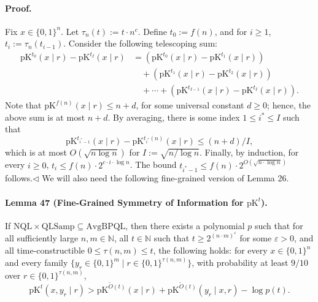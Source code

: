 \documentclass[10pt,a4paper]{article}
\begin{document}
\paragraph{Proof.} Fix $x\in\{0,1\}^n$. Let $\tau_n(t):=t\cdot n^c$. Define $t_0:=f(n)$, and for $i\geq1$, $t_i:=\tau_n(t_{i-1})$. Consider the following telescoping sum:
\begin{align*}
\mathrm{pK}^{t_0}(x\mid r)-\mathrm{pK}^{t_I}(x\mid r)
&=(\mathrm{pK}^{t_0}(x\mid r)-\mathrm{pK}^{t_1}(x\mid r))\\
&\quad+(\mathrm{pK}^{t_1}(x\mid r)-\mathrm{pK}^{t_2}(x\mid r))\\
&\quad+\cdots+(\mathrm{pK}^{t_{I-1}}(x\mid r)-\mathrm{pK}^{t_I}(x\mid r)).
\end{align*}
Note that $\mathrm{pK}^{f(n)}(x\mid r)\leq n+d$, for some universal constant $d\geq0$; hence, the above sum is at most $n+d$. By averaging, there is some index $1\leq i^*\leq I$ such that
\[\mathrm{pK}^{t_{i^*-1}}(x\mid r)-\mathrm{pK}^{t_{i^*}(n)}(x\mid r)\leq(n+d)/I,\]
which is at most $O(\sqrt{n\log n})$ for $I:=\sqrt{n/\log n}$. Finally, by induction, for every $i\geq0$, $t_i\leq f(n)\cdot2^{c\cdot i\cdot\log n}$. The bound $t_{i^*-1}\leq f(n)\cdot2^{O(\sqrt{n\cdot\log n})}$ follows.\hfill$\triangleleft$
We will also need the following fine-grained version of Lemma 26.
\paragraph{Lemma 47 (Fine-Grained Symmetry of Information for $\mathrm{pK}^t$).} If $\mathrm{NQL}\times\mathrm{QLSamp}\subseteq\mathrm{AvgBPQL}$, then there exists a polynomial $p$ such that for all sufficiently large $n,m\in\mathbb N$, all $t\in\mathbb N$ such that $t\geq2^{(n\cdot m)^\varepsilon}$ for some $\varepsilon>0$, and all time-constructible $0\leq\tau(n,m)\leq t$, the following holds: for every $x\in\{0,1\}^n$ and every family $\{y_r\in\{0,1\}^m\mid r\in\{0,1\}^{\tau(n,m)}\}$, with probability at least $9/10$ over $r\in\{0,1\}^{\tau(n,m)}$,
\[\mathrm{pK}^t(x,y_r\mid r)>\mathrm{pK}^{\widetilde O(t)}(x\mid r)+\mathrm{pK}^{\widetilde O(t)}(y_r\mid x,r)-\log p(t).\]
\end{document}
